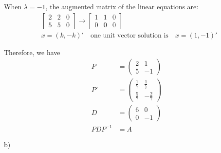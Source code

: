 \documentclass[letterpaper, 11pt]{article}
\newcommand{\1}{\mathds{1}}	%
\theoremstyle{definition}
\begin{document}
When $\lambda=-1$, the augmented matrix of the linear equations are:
\begin{align*}
     & \left[\begin{array}{cc|c}
                     2 & 2 & 0 \\
                     5 & 5 & 0
                 \end{array}\right] \to \left[\begin{array}{cc|c}
                                                  1 & 1 & 0 \\
                                                  0 & 0 & 0
                                              \end{array}\right]                   \\
     & x = (k , -k)'\quad \text{one unit vector solution is} \quad x = (1,-1)'
\end{align*}

Therefore, we have \begin{align*}
    P         & = \begin{pmatrix}
                      2 & 1  \\
                      5 & -1
                  \end{pmatrix}             \\
    P'        & = \begin{pmatrix}
                      \frac{1}{7} & \frac{1}{7}  \\
                      \frac{5}{7} & -\frac{2}{7}
                  \end{pmatrix} \\
    D         & = \begin{pmatrix}
                      6 & 0  \\
                      0 & -1
                  \end{pmatrix}             \\
    PDP ^{-1} & =  A
\end{align*}


b)
\end{document}
